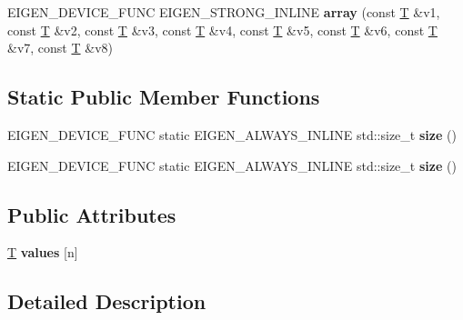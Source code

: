 \begin{DoxyCompactItemize}
\item 
\mbox{\label{class_eigen_1_1array_aa07130c201d8748970b3161fd243db07}} 
E\+I\+G\+E\+N\+\_\+\+D\+E\+V\+I\+C\+E\+\_\+\+F\+U\+NC E\+I\+G\+E\+N\+\_\+\+S\+T\+R\+O\+N\+G\+\_\+\+I\+N\+L\+I\+NE {\bfseries array} (const \hyperlink{group___sparse_core___module}{T} \&v1, const \hyperlink{group___sparse_core___module}{T} \&v2, const \hyperlink{group___sparse_core___module}{T} \&v3, const \hyperlink{group___sparse_core___module}{T} \&v4, const \hyperlink{group___sparse_core___module}{T} \&v5, const \hyperlink{group___sparse_core___module}{T} \&v6, const \hyperlink{group___sparse_core___module}{T} \&v7, const \hyperlink{group___sparse_core___module}{T} \&v8)
\end{DoxyCompactItemize}
\subsection*{Static Public Member Functions}
\begin{DoxyCompactItemize}
\item 
\mbox{\label{class_eigen_1_1array_a332ffdbd5ae2690a6f983959baecc972}} 
E\+I\+G\+E\+N\+\_\+\+D\+E\+V\+I\+C\+E\+\_\+\+F\+U\+NC static E\+I\+G\+E\+N\+\_\+\+A\+L\+W\+A\+Y\+S\+\_\+\+I\+N\+L\+I\+NE std\+::size\+\_\+t {\bfseries size} ()
\item 
\mbox{\label{class_eigen_1_1array_a332ffdbd5ae2690a6f983959baecc972}} 
E\+I\+G\+E\+N\+\_\+\+D\+E\+V\+I\+C\+E\+\_\+\+F\+U\+NC static E\+I\+G\+E\+N\+\_\+\+A\+L\+W\+A\+Y\+S\+\_\+\+I\+N\+L\+I\+NE std\+::size\+\_\+t {\bfseries size} ()
\end{DoxyCompactItemize}
\subsection*{Public Attributes}
\begin{DoxyCompactItemize}
\item 
\mbox{\label{class_eigen_1_1array_ab5d3c23c8a5b40bd013a9c312de0ae25}} 
\hyperlink{group___sparse_core___module}{T} {\bfseries values} \mbox{[}n\mbox{]}
\end{DoxyCompactItemize}


\subsection{Detailed Description}
